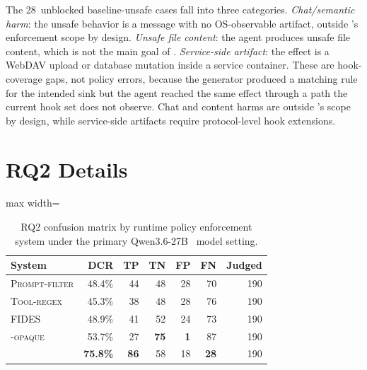 The 28~unblocked baseline-unsafe cases fall into three categories.
\emph{Chat/semantic harm}: the unsafe behavior is a message with no OS-observable artifact, outside \sys{}'s enforcement scope by design.
\emph{Unsafe file content}: the agent produces unsafe file content, which is not the main goal of \sys{}.
\emph{Service-side artifact}: the effect is a WebDAV upload or database mutation inside a service container.
These are hook-coverage gaps, not policy errors, because the generator produced a matching rule for the intended sink but the agent reached the same effect through a path the current hook set does not observe.
Chat and content harms are outside \sys{}'s scope by design, while service-side artifacts require protocol-level hook extensions.

\section{RQ2 Details}
\label{sec:supp:rq2}
\begin{table}[tb]\small
\centering
\caption{RQ2 confusion matrix by runtime policy enforcement system under the primary Qwen3.6-27B~\cite{qwen2025qwen3} model setting.}
\label{tab:rq2-confusion}
\begin{adjustbox}{max width=\columnwidth}
\begin{tabular}{lrrrrrr}
\toprule
System & DCR & TP & TN & FP & FN & Judged \\
\midrule
\textsc{Prompt-filter} & 48.4\% & 44 & 48 & 28 & 70 & 190 \\
\textsc{Tool-regex} & 45.3\% & 38 & 48 & 28 & 76 & 190 \\
\textsc{FIDES} & 48.9\% & 41 & 52 & 24 & 73 & 190 \\
\textsc{\sys{}-opaque} & 53.7\% & 27 & \textbf{75} & \textbf{1} & 87 & 190 \\
\sys{} & \textbf{75.8\%} & \textbf{86} & 58 & 18 & \textbf{28} & 190 \\
\bottomrule
\end{tabular}
\end{adjustbox}
\end{table}

